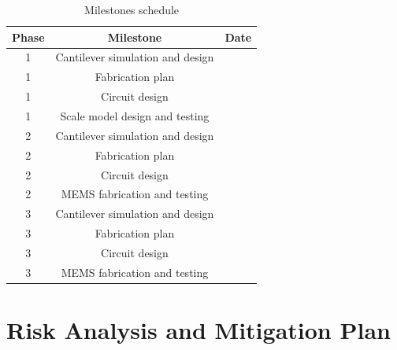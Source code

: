 \begin{table}[h!]
\centering
  \begin{tabular}{|c||c|c|}
    \hline
    Phase & Milestone & Date\\
    \hline
    \hline
    1 & Cantilever simulation and design & \\
    \hline
    1 & Fabrication plan & \\
    \hline
    1 & Circuit design & \\
    \hline
    1 & Scale model design and testing & \\
    \hline
    \hline
    2 & Cantilever simulation and design & \\
    \hline
    2 & Fabrication plan & \\
    \hline
    2 & Circuit design & \\
    \hline
    2 & MEMS fabrication and testing & \\
    \hline
    \hline
    3 & Cantilever simulation and design & \\
    \hline
    3 & Fabrication plan & \\
    \hline
    3 & Circuit design & \\
    \hline
    3 & MEMS fabrication and testing & \\
    \hline
  \end{tabular}
\caption{Milestones schedule}
\label{table:sched}
\end{table}

\section{Risk Analysis and Mitigation Plan}

